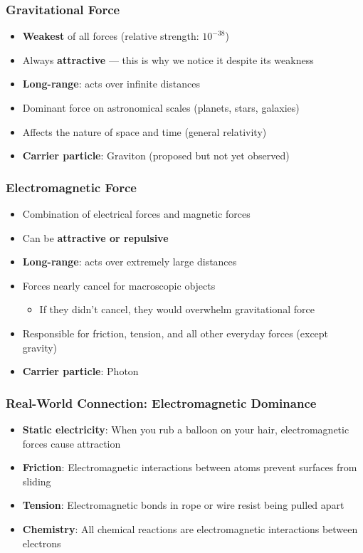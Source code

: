\documentclass{beamer}
\begin{document}
\begin{frame}
\frametitle{Gravitational Force}
\begin{itemize}
    \item \textbf{Weakest} of all forces (relative strength: $10^{-38}$) \pause
    \item Always \textbf{attractive} — this is why we notice it despite its weakness \pause
    \item \textbf{Long-range}: acts over infinite distances \pause
    \item Dominant force on astronomical scales (planets, stars, galaxies) \pause
    \item Affects the nature of space and time (general relativity) \pause
    \item \textbf{Carrier particle}: Graviton (proposed but not yet observed)
\end{itemize}
\end{frame}

\begin{frame}
\frametitle{Electromagnetic Force}
\begin{itemize}
    \item Combination of electrical forces and magnetic forces \pause
    \item Can be \textbf{attractive or repulsive} \pause
    \item \textbf{Long-range}: acts over extremely large distances \pause
    \item Forces nearly cancel for macroscopic objects \pause
    \begin{itemize}
        \item If they didn't cancel, they would overwhelm gravitational force
    \end{itemize} \pause
    \item Responsible for friction, tension, and all other everyday forces (except gravity) \pause
    \item \textbf{Carrier particle}: Photon
\end{itemize}
\end{frame}

\begin{frame}
\frametitle{Real-World Connection: Electromagnetic Dominance}
\begin{itemize}
    \item \textbf{Static electricity}: When you rub a balloon on your hair, electromagnetic forces cause attraction \pause
    \item \textbf{Friction}: Electromagnetic interactions between atoms prevent surfaces from sliding \pause
    \item \textbf{Tension}: Electromagnetic bonds in rope or wire resist being pulled apart \pause
    \item \textbf{Chemistry}: All chemical reactions are electromagnetic interactions between electrons
\end{itemize}
\end{frame}
\end{document}
